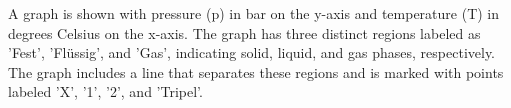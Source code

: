 A graph is shown with pressure (p) in bar on the y-axis and temperature (T) in degrees Celsius on the x-axis. The graph has three distinct regions labeled as 'Fest', 'Flüssig', and 'Gas', indicating solid, liquid, and gas phases, respectively. The graph includes a line that separates these regions and is marked with points labeled 'X', '1', '2', and 'Tripel'.